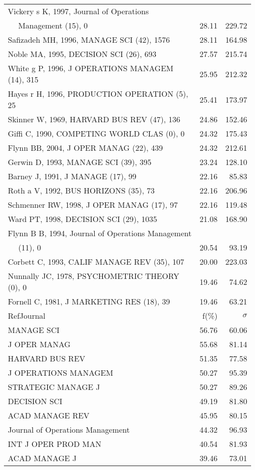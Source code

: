 \documentclass[a4paper,11pt]{report}
\begin{document}
\begin{landscape}
\begin{table}[!ht]
{\begin{tabular}{|l r r|}
Vickery s K, 1997, Journal of Operations &  & \\
$\quad$ Management (15), 0 & 28.11 & 229.72\\
Safizadeh MH, 1996, MANAGE SCI (42), 1576 & 28.11 & 164.98\\
Noble MA, 1995, DECISION SCI (26), 693 & 27.57 & 215.74\\
White g P, 1996, J OPERATIONS MANAGEM (14), 315 & 25.95 & 212.32\\
Hayes r H, 1996, PRODUCTION OPERATION (5), 25 & 25.41 & 173.97\\
Skinner W, 1969, HARVARD BUS REV (47), 136 & 24.86 & 152.46\\
Giffi C, 1990, COMPETING WORLD CLAS (0), 0 & 24.32 & 175.43\\
Flynn BB, 2004, J OPER MANAG (22), 439 & 24.32 & 212.61\\
Gerwin D, 1993, MANAGE SCI (39), 395 & 23.24 & 128.10\\
Barney J, 1991, J MANAGE (17), 99 & 22.16 & 85.83\\
Roth a V, 1992, BUS HORIZONS (35), 73 & 22.16 & 206.96\\
Schmenner RW, 1998, J OPER MANAG (17), 97 & 22.16 & 119.48\\
Ward PT, 1998, DECISION SCI (29), 1035 & 21.08 & 168.90\\
Flynn B B, 1994, Journal of Operations Management &  & \\
$\quad$ (11), 0 & 20.54 & 93.19\\
Corbett C, 1993, CALIF MANAGE REV (35), 107 & 20.00 & 223.03\\
Nunnally JC, 1978, PSYCHOMETRIC THEORY (0), 0 & 19.46 & 74.62\\
Fornell C, 1981, J MARKETING RES (18), 39 & 19.46 & 63.21\\
\hline
\hline
RefJournal & f(\%) & $\sigma$\\
\hline
MANAGE SCI & 56.76 & 60.06\\
J OPER MANAG & 55.68 & 81.14\\
HARVARD BUS REV & 51.35 & 77.58\\
J OPERATIONS MANAGEM & 50.27 & 95.39\\
STRATEGIC MANAGE J & 50.27 & 89.26\\
DECISION SCI & 49.19 & 81.80\\
ACAD MANAGE REV & 45.95 & 80.15\\
Journal of Operations Management & 44.32 & 96.93\\
INT J OPER PROD MAN & 40.54 & 81.93\\
ACAD MANAGE J & 39.46 & 73.01\\
\hline
\end{tabular}
}
\end{table}


\end{landscape}
\end{document}
